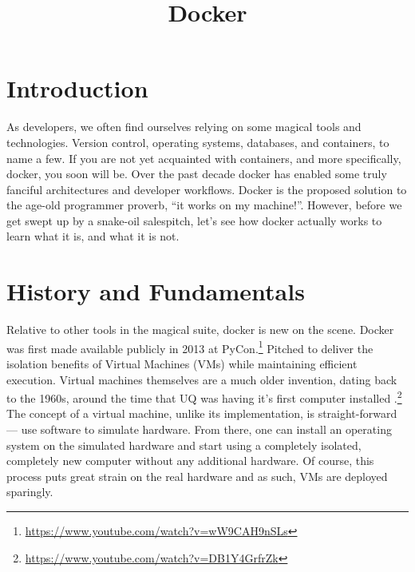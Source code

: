 \title{Docker}
\maketitle

\section{Introduction}
As developers, we often find ourselves relying on some magical tools and technologies.
Version control, operating systems, databases, and containers, to name a few.
If you are not yet acquainted with containers, and more specifically, docker, you soon will be.
Over the past decade docker has enabled some truly fanciful architectures and developer workflows.
Docker is the proposed solution to the age-old programmer proverb, ``it works on my machine!''.
However, before we get swept up by a snake-oil salespitch, let's see how docker actually works to learn what it is, and what it is not.

\section{History and Fundamentals}
Relative to other tools in the magical suite, docker is new on the scene.
Docker was first made available publicly in 2013 at PyCon.\footnote{\url{https://www.youtube.com/watch?v=wW9CAH9nSLs}}
Pitched to deliver the isolation benefits of Virtual Machines (VMs) while maintaining efficient execution.
Virtual machines themselves are a much older invention, dating back to the 1960s, around the time that UQ was having it's first computer installed%
.\footnote{\url{https://www.youtube.com/watch?v=DB1Y4GrfrZk}}
The concept of a virtual machine, unlike its implementation, is straight-forward --- use software to simulate hardware.
From there, one can install an operating system on the simulated hardware and start using a completely isolated, completely new computer without any additional hardware.
Of course, this process puts great strain on the real hardware and as such, VMs are deployed sparingly.

